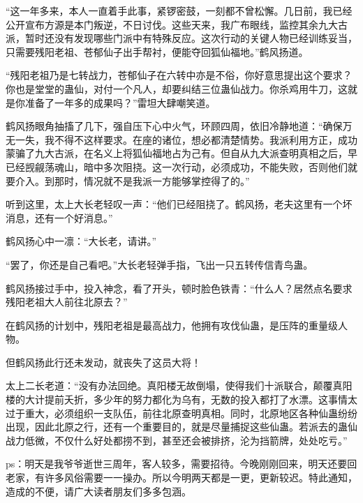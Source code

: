 \begin{this_body}
“这一年多来，本人一直着手此事，紧锣密鼓，一刻都不曾松懈。几日前，我已经公开宣布方源是本门叛逆，不日讨伐。这些天来，我广布眼线，监控其余九大古派，暂时还没有发现哪些门派中有特殊反应。这次行动的关键人物已经训练妥当，只需要残阳老祖、苍郁仙子出手帮衬，便能夺回狐仙福地。”鹤风扬道。

“残阳老祖乃是七转战力，苍郁仙子在六转中亦是不俗，你好意思提出这个要求？你也是堂堂的蛊仙，对付一个凡人，却要纠结三位蛊仙战力。你杀鸡用牛刀，这就是你准备了一年多的成果吗？”雷坦大肆嘲笑道。

鹤风扬眼角抽搐了几下，强自压下心中火气，环顾四周，依旧冷静地道：“确保万无一失，我不得不这样要求。在座的诸位，想必都清楚情势。我派利用方正，成功蒙骗了九大古派，在名义上将狐仙福地占为己有。但自从九大派查明真相之后，早已经觊觎荡魂山，暗中多次阻挠。这一次行动，必须成功，不能失败，否则他们就要介入。到那时，情况就不是我派一方能够掌控得了的。”

听到这里，太上大长老轻叹一声：“他们已经阻挠了。鹤风扬，老夫这里有一个坏消息，还有一个好消息。”

鹤风扬心中一凛：“大长老，请讲。”

“罢了，你还是自己看吧。”大长老轻弹手指，飞出一只五转传信青鸟蛊。

鹤风扬接过手中，投入神念，看了开头，顿时脸色铁青：“什么人？居然点名要求残阳老祖大人前往北原去？”

在鹤风扬的计划中，残阳老祖是最高战力，他拥有攻伐仙蛊，是压阵的重量级人物。

但鹤风扬此行还未发动，就丧失了这员大将！

太上二长老道：“没有办法回绝。真阳楼无故倒塌，使得我们十派联合，颠覆真阳楼的大计提前夭折，多少年的努力都化为乌有，无数的投入都打了水漂。这事情太过于重大，必须组织一支队伍，前往北原查明真相。同时，北原地区各种仙蛊纷纷出现，因此北原之行，还有一个重要目的，就是尽量捕捉这些仙蛊。若派去的蛊仙战力低微，不仅什么好处都捞不到，甚至还会被排挤，沦为挡箭牌，处处吃亏。”

ps：明天是我爷爷逝世三周年，客人较多，需要招待。今晚刚刚回来，明天还要回老家，有许多风俗需要一一操办。所以今明两天都是一更，更新较迟。特此通知，造成的不便，请广大读者朋友们多多包涵。

\end{this_body}

